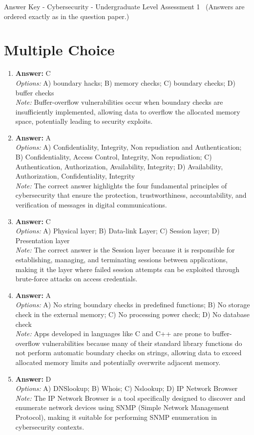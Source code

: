 \documentclass[12pt]{article}
\begin{document}
\begin{center}
Answer Key - Cybersecurity - Undergraduate Level Assessment 1 \
\small (Answers are ordered exactly as in the question paper.)
\end{center}

\section*{Multiple Choice}
\begin{enumerate}[label=\arabic*.]
\item \textbf{Answer:} C
\\ \textit{Options:} A) boundary hacks; B) memory checks; C) boundary checks; D) buffer checks
\\ \textit{Note:} Buffer-overflow vulnerabilities occur when boundary checks are insufficiently implemented, allowing data to overflow the allocated memory space, potentially leading to security exploits.
\item \textbf{Answer:} A
\\ \textit{Options:} A) Confidentiality, Integrity, Non repudiation and Authentication; B) Confidentiality, Access Control, Integrity, Non repudiation; C) Authentication, Authorization, Availability, Integrity; D) Availability, Authorization, Confidentiality, Integrity
\\ \textit{Note:} The correct answer highlights the four fundamental principles of cybersecurity that ensure the protection, trustworthiness, accountability, and verification of messages in digital communications.
\item \textbf{Answer:} C
\\ \textit{Options:} A) Physical layer; B) Data-link Layer; C) Session layer; D) Presentation layer
\\ \textit{Note:} The correct answer is the Session layer because it is responsible for establishing, managing, and terminating sessions between applications, making it the layer where failed session attempts can be exploited through brute-force attacks on access credentials.
\item \textbf{Answer:} A
\\ \textit{Options:} A) No string boundary checks in predefined functions; B) No storage check in the external memory; C) No processing power check; D) No database check
\\ \textit{Note:} Apps developed in languages like C and C++ are prone to buffer-overflow vulnerabilities because many of their standard library functions do not perform automatic boundary checks on strings, allowing data to exceed allocated memory limits and potentially overwrite adjacent memory.
\item \textbf{Answer:} D
\\ \textit{Options:} A) DNSlookup; B) Whois; C) Nslookup; D) IP Network Browser
\\ \textit{Note:} The IP Network Browser is a tool specifically designed to discover and enumerate network devices using SNMP (Simple Network Management Protocol), making it suitable for performing SNMP enumeration in cybersecurity contexts.
\end{enumerate}
\end{document}
